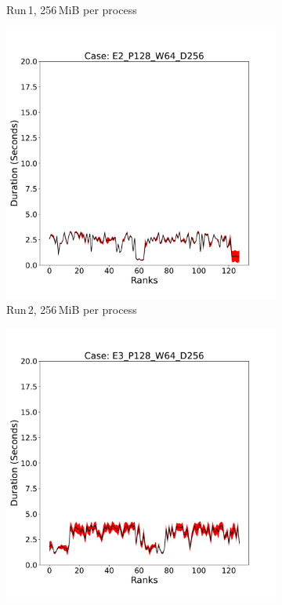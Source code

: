 \begin{figure}
\begin{subfigure}[b]{0.3\textwidth}
         \caption{Run\,1, 256\,MiB per process }
         \label{fig:E1_256_d2}
     \end{subfigure}
     \hfill
     \begin{subfigure}[b]{0.3\textwidth}
         \centering
         \includegraphics[width=\textwidth, height=\textwidth]{figures/deisa2__E2_P128_W64_D256.pdf}
         \caption{Run\,2, 256\,MiB per process}
         \label{fig:E2_256_d2}
     \end{subfigure}
      \hfill
     \begin{subfigure}[b]{0.3\textwidth}
         \centering
         \includegraphics[width=\textwidth, height=\textwidth]{figures/deisa2__E3_P128_W64_D256.pdf}

\end{subfigure}
\end{figure}
